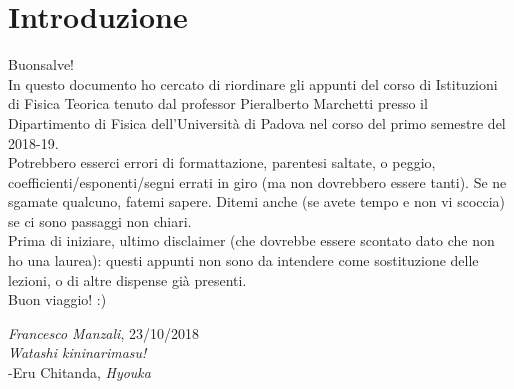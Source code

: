 \chapter*{Introduzione}
Buonsalve!\\
In questo documento ho cercato di riordinare gli appunti del corso di Istituzioni di Fisica Teorica tenuto dal professor Pieralberto Marchetti  presso il Dipartimento di Fisica dell'Università di Padova nel corso del primo semestre del 2018-19.\\
Potrebbero esserci errori di formattazione, parentesi saltate, o peggio, coefficienti/esponenti/segni errati in giro (ma non dovrebbero essere tanti). Se ne sgamate qualcuno, fatemi sapere. Ditemi anche (se avete tempo e non vi scoccia) se ci sono passaggi non chiari.\\
Prima di iniziare, ultimo disclaimer (che dovrebbe essere scontato dato che non ho una laurea): questi appunti non sono da intendere come sostituzione delle lezioni, o di altre dispense già presenti.\\
Buon viaggio! :)

\begin{flushright}
\textit{Francesco Manzali}, 23/10/2018\\
\vspace{5em}
\textit{Watashi kininarimasu!}\\
-Eru Chitanda, \textit{Hyouka}
\end{flushright}
\clearpage